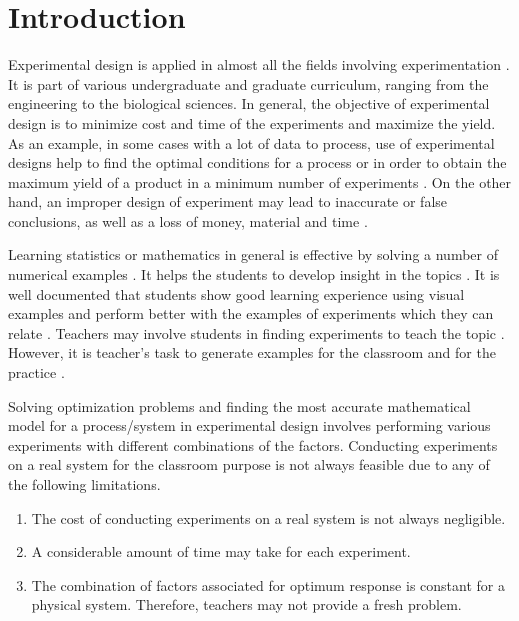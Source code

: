 \documentclass[twocolumn]{svjour3}          %
\begin{document}
\section{Introduction}
Experimental design is applied in almost all the fields involving experimentation \cite{fisher1937design,quinn2002experimental,montgomery2008design,antony2014design}. It is part of various undergraduate and graduate curriculum, ranging from the engineering to the biological sciences. In general, the objective of experimental design is to minimize cost and time of the experiments and maximize the yield. As an example, in some cases with a lot of data to process, use of experimental designs help to find the optimal conditions for a process or in order to obtain the maximum yield of a product in a minimum number of experiments \cite{B703690F}. On the other hand, an improper design of experiment may lead to inaccurate or false conclusions, as well as a loss of money, material and time \cite{Festing2003341}.
\par
Learning statistics or mathematics in general is effective by solving a number of numerical examples \cite{zhu1987learning}. It helps the students to develop insight in the topics \cite{renkl1997learning}. It is well documented that students show good learning experience using visual examples and perform better with the examples of experiments which they can relate \cite{hattie2013visible}. Teachers may involve students in finding experiments to teach the topic \cite{Hunter1977Some,fried2006mathematics,Hiebert82}. However, it is teacher's task to generate examples for the classroom and for the practice \cite{Deborah2008}.
\par
Solving optimization problems and finding the most accurate mathematical model for a process/system in experimental design involves performing various experiments with different combinations of the factors. Conducting experiments on a real system for the classroom purpose is not always feasible due to any of the following limitations.
\begin{enumerate}
	\item The cost of conducting experiments on a real system is not always negligible.
	\item A considerable amount of time may take for each experiment.
	\item The combination of factors associated for optimum response is constant for a physical system. Therefore, teachers may not provide a fresh problem.
\end{enumerate}
\par
\end{document}
